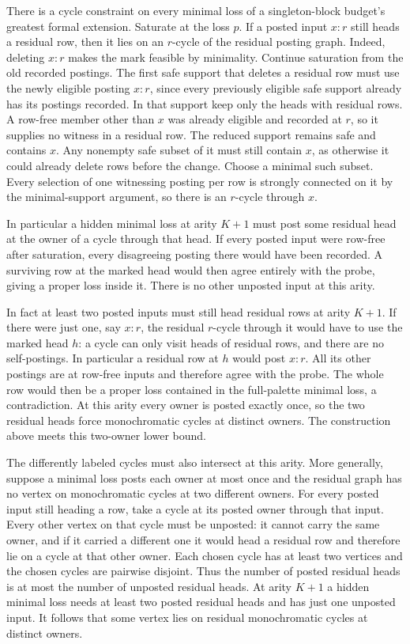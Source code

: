 There is a cycle constraint on every minimal
loss of a singleton-block budget's greatest
formal extension. Saturate at the loss $p$.
If a posted input $x:r$ still heads a
residual row, then it lies on an $r$-cycle
of the residual posting graph. Indeed,
deleting $x:r$ makes the mark feasible
by minimality. Continue saturation from
the old recorded postings. The first safe
support that deletes a residual row must
use the newly eligible posting $x:r$,
since every previously eligible safe
support already has its postings recorded.
In that support keep only the heads with
residual rows. A row-free member other
than $x$ was already eligible and recorded
at $r$, so it supplies no witness in a
residual row. The reduced support remains
safe and contains $x$. Any nonempty safe
subset of it must still contain $x$, as
otherwise it could already delete rows
before the change. Choose a minimal such
subset. Every selection of one witnessing
posting per row is strongly connected on
it by the minimal-support argument, so
there is an $r$-cycle through $x$.

In particular a hidden minimal loss at
arity $K+1$ must post some residual head
at the owner of a cycle through that head.
If every posted input were row-free after
saturation, every disagreeing posting
there would have been recorded. A surviving
row at the marked head would then agree
entirely with the probe, giving a proper
loss inside it. There is no other unposted
input at this arity.

In fact at least two posted inputs must still
head residual rows at arity $K+1$. If there were
just one, say $x:r$, the residual $r$-cycle
through it would have to use the marked head
$h$: a cycle can only visit heads of residual
rows, and there are no self-postings. In
particular a residual row at $h$ would post
$x:r$. All its other postings are at row-free
inputs and therefore agree with the probe.
The whole row would then be a proper loss
contained in the full-palette minimal loss,
a contradiction. At this arity every owner
is posted exactly once, so the two residual
heads force monochromatic cycles at distinct
owners. The construction above meets this
two-owner lower bound.

The differently labeled cycles must also
intersect at this arity. More generally,
suppose a minimal loss posts each owner at
most once and the residual graph has no
vertex on monochromatic cycles at two
different owners. For every posted input
still heading a row, take a cycle at its
posted owner through that input. Every
other vertex on that cycle must be
unposted: it cannot carry the same owner,
and if it carried a different one it
would head a residual row and therefore
lie on a cycle at that other owner.
Each chosen cycle has at least two
vertices and the chosen cycles are
pairwise disjoint. Thus the number of
posted residual heads is at most the
number of unposted residual heads. At
arity $K+1$ a hidden minimal loss needs
at least two posted residual heads and
has just one unposted input. It follows
that some vertex lies on residual
monochromatic cycles at distinct owners.

